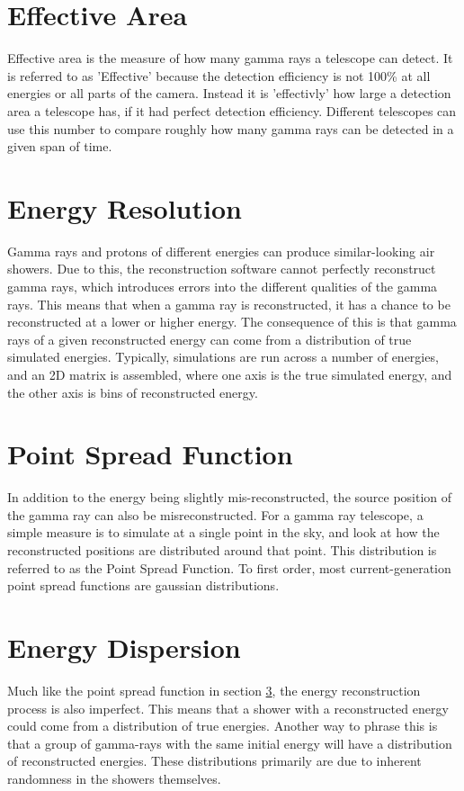 \section{Effective Area}
Effective area is the measure of how many gamma rays a telescope can detect.
It is referred to as 'Effective' because the detection efficiency is not 100\% at all energies or all parts of the camera.
Instead it is 'effectivly' how large a detection area a telescope has, if it had perfect detection efficiency.
Different telescopes can use this number to compare roughly how many gamma rays can be detected in a given span of time.

\section{Energy Resolution}
Gamma rays and protons of different energies can produce similar-looking air showers.
Due to this, the reconstruction software cannot perfectly reconstruct gamma rays, which introduces errors into the different qualities of the gamma rays.
This means that when a gamma ray is reconstructed, it has a chance to be reconstructed at a lower or higher energy.
The consequence of this is that gamma rays of a given reconstructed energy can come from a distribution of true simulated energies.
Typically, simulations are run across a number of energies, and an 2D matrix is assembled, where one axis is the true simulated energy, and the other axis is bins of reconstructed energy.

\section{Point Spread Function}\label{sec:psf}
In addition to the energy being slightly mis-reconstructed, the source position of the gamma ray can also be misreconstructed.
For a gamma ray telescope, a simple measure is to simulate at a single point in the sky, and look at how the reconstructed positions are distributed around that point.
This distribution is referred to as the Point Spread Function.
To first order, most current-generation point spread functions are gaussian distributions.

\section{Energy Dispersion}
Much like the point spread function in section \ref{sec:psf}, the energy reconstruction process is also imperfect.
This means that a shower with a reconstructed energy could come from a distribution of true energies.
Another way to phrase this is that a group of gamma-rays with the same initial energy will have a distribution of reconstructed energies.
These distributions primarily are due to inherent randomness in the showers themselves.

